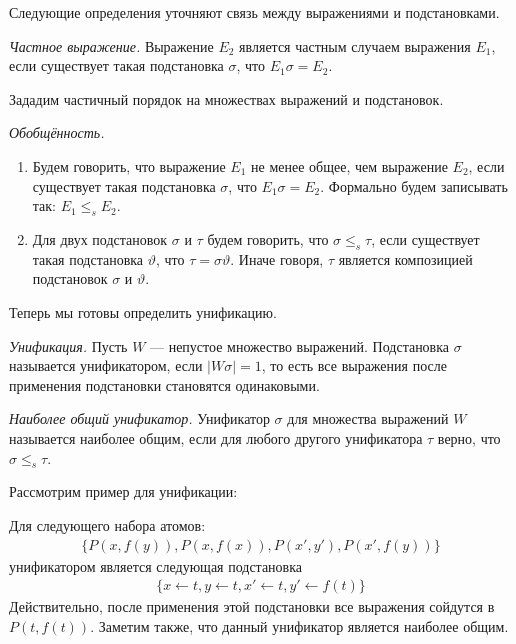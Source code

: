 Следующие определения уточняют связь между выражениями и подстановками.
\begin{definition}
\emph{Частное выражение.} Выражение $E_2$ является частным случаем выражения $E_1$, если существует такая подстановка $\sigma$, что $E_1\sigma = E_2$.
\end{definition}

Зададим частичный порядок на множествах выражений и подстановок.
\begin{definition}
\emph{Обобщённость.}
  \begin{enumerate}
	\item Будем говорить, что выражение $E_1$ не менее общее, чем выражение $E_2$, если существует такая подстановка $\sigma$, что $E_1\sigma = E_2$. Формально будем записывать так: $E_1 \leq_s E_2$.
    \item Для двух подстановок $\sigma$ и $\tau$ будем говорить, что $\sigma \leq_s \tau$, если существует такая подстановка $\vartheta$, что $\tau = \sigma\vartheta$. Иначе говоря, $\tau$ является композицией подстановок $\sigma$ и $\vartheta$.
  \end{enumerate}
\end{definition}

Теперь мы готовы определить унификацию.

\begin{definition}
\emph{Унификация.} Пусть $W$ --- непустое множество выражений. Подстановка $\sigma$ называется унификатором, если $|W\sigma| = 1$, то есть все выражения после применения подстановки становятся одинаковыми.
\end{definition}

\begin{definition}
\emph{Наиболее общий унификатор.} Унификатор $\sigma$ для множества выражений $W$ называется наиболее общим, если для любого другого унификатора $\tau$ верно, что $\sigma \leq_s \tau$.
\end{definition}

Рассмотрим пример для унификации:
\begin{example}
Для следующего набора атомов:
\begin{gather*}
\{ P(x, f(y)), P(x, f(x)), P(x',y'), P(x', f(y)) \}
\end{gather*}
унификатором является следующая подстановка
\begin{gather*}
\{ x \leftarrow t, y \leftarrow t, x' \leftarrow t, y' \leftarrow f(t) \}
\end{gather*}
Действительно, после применения этой подстановки все выражения сойдутся в $P(t, f(t))$. Заметим также, что данный унификатор является наиболее общим.
\end{example}

